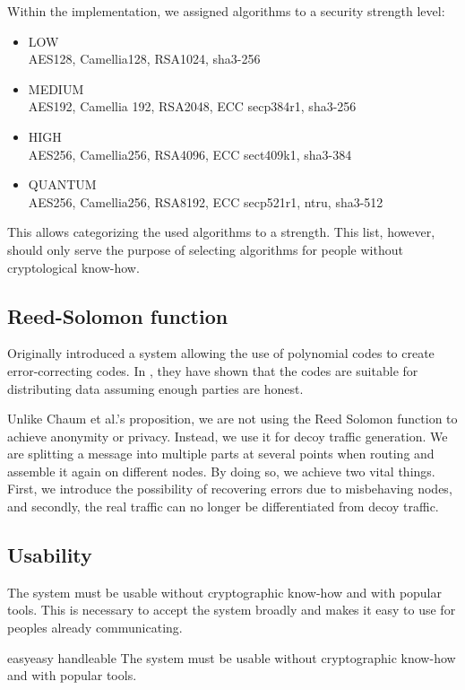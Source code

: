 Within the implementation, we assigned algorithms to a security strength level:
\begin{itemize}
	\item LOW\\
	AES128, Camellia128, RSA1024, sha3-256
	\item MEDIUM\\
	AES192, Camellia 192, RSA2048, ECC secp384r1, sha3-256
	\item HIGH\\
	AES256, Camellia256, RSA4096, ECC sect409k1, sha3-384
	\item QUANTUM\\
	AES256, Camellia256, RSA8192, ECC secp521r1, ntru, sha3-512
\end{itemize}

This allows categorizing the used algorithms to a strength. This list, however, should only serve the purpose of selecting algorithms for people without cryptological know-how.

\subsection{Reed-Solomon function}
Originally \cite{reed1960polynomial} introduced a system allowing the use of polynomial codes to create error-correcting codes. In \cite{chaum1988multiparty} \citeauthor{chaum1988multiparty}, they have shown that the codes are suitable for distributing data assuming enough parties are honest.

Unlike Chaum et al.'s proposition, we are not using the Reed Solomon function to achieve anonymity or privacy. Instead, we use it for decoy traffic generation. We are splitting a message into multiple parts at several points when routing and assemble it again on different nodes. By doing so, we achieve two vital things. First, we introduce the possibility of recovering errors due to misbehaving nodes, and secondly, the real traffic can no longer be differentiated from decoy traffic. 

\subsection{Usability}
The system must be usable without cryptographic know-how and with popular tools. This is necessary to accept the system broadly and makes it easy to use for peoples already communicating.

\begin{requirement}{easy}{easy handleable}
	The system must be usable without cryptographic know-how and with popular tools.
\end{requirement}

